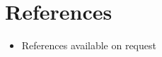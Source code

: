 \documentclass[11pt,a4paper,sans]{moderncv}        %
\begin{document}
\newpage
\section{References}

\vspace{3pt}
 
\begin{itemize}

\item{References available on request}

\end{itemize}

\nocite{*}



\end{document}
